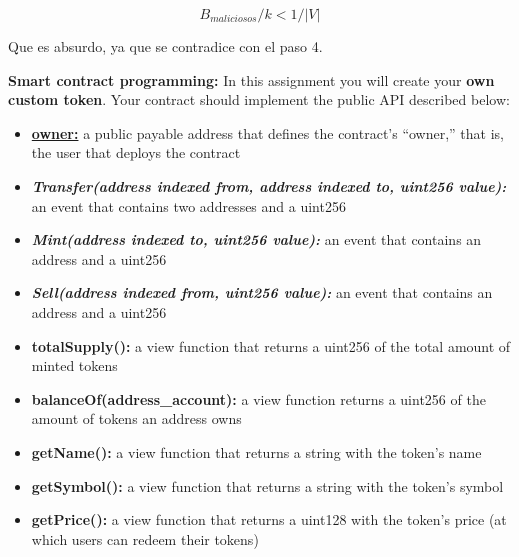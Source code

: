 \documentclass[12pt,addpoints,answers]{exam}
\begin{document}
\begin{questions}
\begin{parts}
\begin{solution}
\begin{enumerate}
{{            $$B_{maliciosos} / k < 1/|V| $$

            Que es absurdo, ya que se contradice con el paso 4.

            
            }

            }
        \end{enumerate}

    \end{solution}

\end{parts}

\newpage

\question \textbf{Smart contract programming:}  In this assignment you will create your {\bf own custom token}. Your contract should implement the public API described below:

\begin{itemize}
\item \underline{\textbf{owner:}} a public payable address that defines the contract’s ``owner,'' that is, the user that deploys the contract
\item \textbf{\textit{Transfer(address indexed from, address indexed to, uint256 value):}} an event that contains two addresses and a uint256
\item \textbf{\textit{Mint(address indexed to, uint256 value):}} an event that contains an address and a uint256
\item \textbf{\textit{Sell(address indexed from, uint256 value):}} an event that contains an address and a uint256

\item \textbf{totalSupply():} a view function that returns a uint256 of the total amount of minted tokens
\item \textbf{balanceOf(address\_account):} a view function returns a uint256 of the amount of tokens
an address owns
\item \textbf{getName():} a view function that returns a string with the token’s name
\item \textbf{getSymbol():} a view function that returns a string with the token’s symbol
\item \textbf{getPrice():} a view function that returns a uint128 with the token’s price (at which users can
redeem their tokens)


\end{itemize}
\end{questions}
\end{document}
